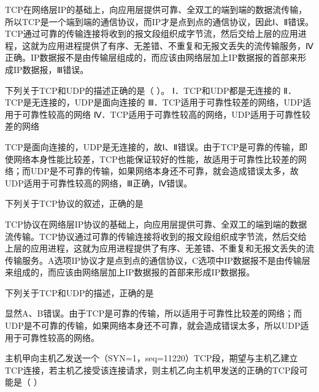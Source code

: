 \begin{solution}TCP在网络层IP的基础上，向应用层提供可靠、全双工的端到端的数据流传输，所以TCP是一个端到端的通信协议，而IP才是点到点的通信协议，因此Ⅰ、Ⅱ错误。TCP通过可靠的传输连接将收到的报文段组织成字节流，然后交给上层的应用进程，这就为应用进程提供了有序、无差错、不重复和无报文丢失的流传输服务，Ⅳ正确。IP数据报不是由传输层组成的，而应该由网络层加上IP数据报的首部来形成IP数据报，Ⅲ错误。
\end{solution}
\question 下列关于TCP和UDP的描述正确的是（ ）。 Ⅰ．TCP和UDP都是无连接的
Ⅱ．TCP是无连接的，UDP是面向连接的
Ⅲ．TCP适用于可靠性较差的网络，UDP适用于可靠性较高的网络
Ⅳ．TCP适用于可靠性较高的网络，UDP适用于可靠性较差的网络
\par{}
\begin{solution}TCP是面向连接的，UDP是无连接的，故Ⅰ、Ⅱ错误。由于TCP是可靠的传输，即使网络本身性能比较差，TCP也能保证较好的性能，故适用于可靠性比较差的网络；而UDP是不可靠的传输，如果网络本身还不可靠，就会造成错误太多，故UDP适用于可靠性较高的网络，Ⅲ正确，Ⅳ错误。
\end{solution}
\question 下列关于TCP协议的叙述，正确的是
\par{}
\begin{solution}TCP协议在网络层IP协议的基础上，向应用层提供可靠、全双工的端到端的数据流传输。TCP协议通过可靠的传输连接将收到的报文段组织成字节流，然后交给上层的应用进程，这就为应用进程提供了有序、无差错、不重复和无报文丢失的流传输服务。A选项IP协议才是点到点的通信协议，C选项中IP数据报不是由传输层来组成的，而应该由网络层加上IP数据报的首部来形成IP数据报。
\end{solution}
\question 下列关于TCP和UDP的描述，正确的是
\par{}
\begin{solution}显然A、B错误。由于TCP是可靠的传输，所以适用于可靠性比较差的网络；而UDP是不可靠的传输，如果网络本身还不可靠，就会造成错误太多，所以UDP适用于可靠性较高的网络。
\end{solution}
\question 主机甲向主机乙发送一个（SYN=1，seq=11220）TCP段，期望与主机乙建立TCP连接，若主机乙接受该连接请求，则主机乙向主机甲发送的正确的TCP段可能是（
）
\par{}
